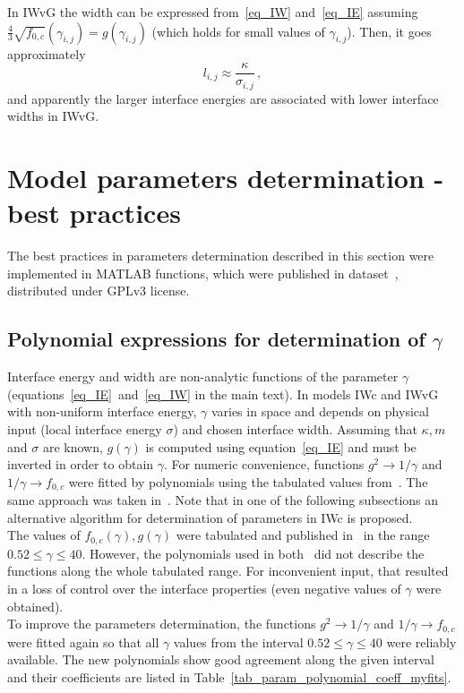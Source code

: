 In IWvG the width can be expressed from~\eqref{eq_IW} and~\eqref{eq_IE} assuming $\frac{4}{3}\sqrt{f_{0,c}}(\gamma_{i,j})=g(\gamma_{i,j})$ (which holds for small values of $\gamma_{i,j}$). Then, it goes approximately
\begin{equation}
	l_{i,j} \approx \frac{\kappa}{\sigma_{i,j}} \,,
\end{equation}
and apparently the larger interface energies are associated with lower interface widths in IWvG. 

\section{Model parameters determination - best practices}
\label{sec_suppl_param_det}
The best practices in parameters determination described in this section were implemented in MATLAB functions, which were published in dataset~\cite{Minar2022dataset}, distributed under GPLv3 license.

\subsection{Polynomial expressions for determination of $\gamma$} \label{sec_param_det_polynomials}
Interface energy and width are non-analytic functions of the parameter $\gamma$  (equations~\eqref{eq_IE}~and~\eqref{eq_IW} in the main text). In models IWc and IWvG with non-uniform interface energy, $\gamma$ varies in space and depends on physical input (local interface energy $\sigma$) and chosen interface width. Assuming that $\kappa,m$ and $\sigma$ are known, $g(\gamma)$ is computed using equation~\eqref{eq_IE} and must be inverted in order to obtain $\gamma$. For numeric convenience, functions $g^2\rightarrow 1/\gamma$ and $ 1/\gamma \rightarrow f_{0,c}$ were fitted by polynomials using the tabulated values from~\cite{Ravash2017}. The same approach was taken in~\cite{Moelans2008}. Note that in one of the following subsections an alternative algorithm for determination of parameters in IWc is proposed. \\
The values of $f_{0,c}(\gamma),g(\gamma)$ were tabulated and published in~\cite{Ravash2017} in the range $0.52\leq\gamma\leq 40$. However, the polynomials used in both~\cite{Moelans2008,Ravash2017} did not describe the functions along the whole tabulated range. For inconvenient input, that resulted in a loss of control over the interface properties (even negative values of $\gamma$ were obtained). \\
To improve the parameters determination, the functions $g^2\rightarrow 1/\gamma$ and $ 1/\gamma \rightarrow f_{0,c}$ were fitted again so that all $\gamma$ values from the interval $0.52\leq\gamma\leq 40$ were reliably available. The new polynomials show good agreement along the given interval and their coefficients are listed in Table~\ref{tab_param_polynomial_coeff_myfits}. 

